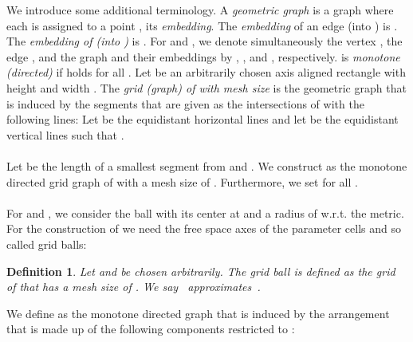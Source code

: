 \documentclass[a4paper,11pt]{article}
\newtheorem{definition}{Definition}
\begin{document}
We introduce some additional terminology. 	A \emph{geometric graph } is a graph where each  is assigned to a point , its \emph{embedding}. The \emph{embedding} of an edge  (into ) is . The \emph{embedding of  (into )} is . For  and , we denote simultaneously the vertex , the edge , and the graph  and their embeddings by , , and , respectively.  is \emph{monotone (directed)} if  holds for all .  Let  be an arbitrarily chosen axis aligned rectangle with height  and width . The \emph{grid (graph) of  with mesh size } is the geometric graph that is induced by the segments that are given as the intersections of  with the following lines: Let  be the  equidistant horizontal lines and let  be the  equidistant vertical lines such that . \\ \\
  Let  be the length of a smallest segment from  and . We construct  as the monotone directed grid graph of  with a mesh size of . Furthermore, we set  for all .\\ \\
  For  and , we consider the ball  with its center at  and a radius of  w.r.t. the  metric. 
For the construction of  we need the free space axes of the parameter cells and so called grid balls:


\begin{definition}\label{def:gridball}
	Let  and  be chosen arbitrarily. The \emph{grid ball } is defined as the grid of  that has a mesh size of . We say~ \emph{approximates}~.
\end{definition}

We define  as the monotone directed graph that is induced by the arrangement that is made up of the following components restricted to : 
\end{document}
